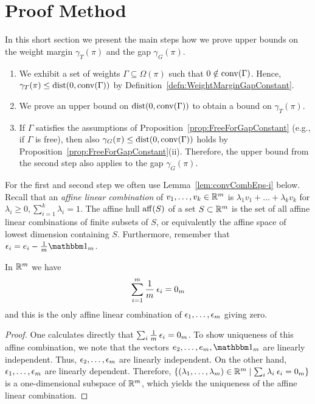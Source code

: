 \section{Proof Method} \label{sec:ProofMethod}

In this short section we present the main steps how we prove upper bounds on the weight margin $\gamma_T(\pi)$ and the gap $\gamma_G(\pi)$.
	\begin{enumerate}
		\item We exhibit a set of weights $\Gamma \subseteq \Omega(\pi)$ such that $0 \notin \operatorname{conv}(\Gamma)$. Hence, $\gamma_T(\pi) \leq \operatorname{dist}( 0, \operatorname{conv}(\Gamma) )$ by Definition~\ref{defn:WeightMarginGapConstant}. 
		
		\item We prove an upper bound on $\operatorname{dist}( 0, \operatorname{conv}(\Gamma) )$ to obtain a bound on $\gamma_T(\pi)$.
		
		\item If $\Gamma$ satisfies the assumptions of Proposition~\ref{prop:FreeForGapConstant} (e.g., if $\Gamma$ is free), then also $\gamma_G(\pi) \leq \operatorname{dist}( 0, \operatorname{conv}(\Gamma) )$ holds by Proposition~\ref{prop:FreeForGapConstant}(ii). Therefore, the upper bound from the second step also applies to the gap $\gamma_G(\pi)$.
	\end{enumerate}


For the first and second step we often use Lemma~\ref{lem:convCombEps-i} below. Recall that an \emph{affine linear combination} of $v_1, \dots, v_k \in \mathbb R^m$ is $\lambda_1 v_1 + \dots + \lambda_k v_k$ for $\lambda_i \geq 0, \sum_{i = 1}^k \lambda_i = 1$. The affine hull $\operatorname{aff}(S)$ of a set $S\subset \mathbb R^m$ is the set of all affine linear combinations of finite subsets of $S$, or equivalently the affine space of lowest dimension containing $S$. Furthermore, remember that $\eps_i = e_i - \frac{1}{m} \ones_m$.

\begin{lemma} \label{lem:convCombEps-i}
	In $\mathbb R^m$ we have
	\begin{equation}\label{eq:SumEps-i}
		\sum_{i=1}^m \frac{1}{m} \: \epsilon_i = 0_m
	\end{equation}
	and this is the only affine linear combination of $\epsilon_1,\ldots,\epsilon_m$ giving zero.
\end{lemma}

\begin{proof}
	One calculates directly that $\sum_i \frac{1}{m} \, \epsilon_i = 0_m$. To show uniqueness of this affine combination, we note that the vectors $e_2, \ldots, e_m, \ones_m$ are linearly independent. Thus, $\epsilon_2, \ldots, \epsilon_m$ are linearly independent. On the other hand, $\epsilon_1,\ldots, \epsilon_m$ are linearly dependent. Therefore,
	$
	\left\lbrace (\lambda_1,\ldots,\lambda_m) \in \mathbb R^m \mid \sum_i \lambda_i \: \epsilon_i = 0_m \right\rbrace
	$
	is a one-dimensional subspace of $\mathbb R^m$, which yields the uniqueness of the affine linear combination.
\end{proof}





